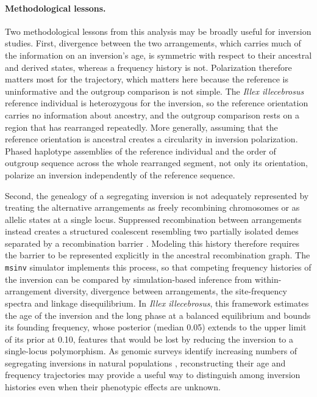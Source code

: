 \documentclass[11pt]{article}
\newcommand{\illex}{\textit{Illex illecebrosus}}
\begin{document}
\paragraph{Methodological lessons.} Two methodological lessons from this analysis may be broadly useful for inversion studies. First, divergence between the two arrangements, which carries much of the information on an inversion's age, is symmetric with respect to their ancestral and derived states, whereas a frequency history is not. Polarization therefore matters most for the trajectory, which matters here because the reference is uninformative and the outgroup comparison is not simple. The \illex{} reference individual is heterozygous for the inversion, so the reference orientation carries no information about ancestry, and the outgroup comparison rests on a region that has rearranged repeatedly. More generally, assuming that the reference orientation is ancestral creates a circularity in inversion polarization. Phased haplotype assemblies of the reference individual and the order of outgroup sequence across the whole rearranged segment, not only its orientation, polarize an inversion independently of the reference sequence.

Second, the genealogy of a segregating inversion is not adequately represented by treating the alternative arrangements as freely recombining chromosomes or as allelic states at a single locus. Suppressed recombination between arrangements instead creates a structured coalescent resembling two partially isolated demes separated by a recombination barrier \citep{navarro2000,guerrero2012}. Modeling this history therefore requires the barrier to be represented explicitly in the ancestral recombination graph. The \texttt{msinv} simulator implements this process, so that competing frequency histories of the inversion can be compared by simulation-based inference from within-arrangement diversity, divergence between arrangements, the site-frequency spectra and linkage disequilibrium. In \illex{}, this framework estimates the age of the inversion and the long phase at a balanced equilibrium and bounds its founding frequency, whose posterior (median 0.05) extends to the upper limit of its prior at 0.10, features that would be lost by reducing the inversion to a single-locus polymorphism. As genomic surveys identify increasing numbers of segregating inversions in natural populations \citep{wellenreuther2018,merot2020}, reconstructing their age and frequency trajectories may provide a useful way to distinguish among inversion histories even when their phenotypic effects are unknown.
\end{document}
